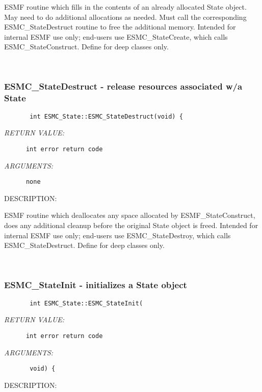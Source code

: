         ESMF routine which fills in the contents of an already
        allocated State object.  May need to do additional allocations
        as needed.  Must call the corresponding ESMC\_StateDestruct
        routine to free the additional memory.  Intended for internal
        ESMF use only; end-users use ESMC\_StateCreate, which calls
        ESMC\_StateConstruct.  Define for deep classes only.
   
 
\mbox{}\hrulefill\ 
 
\subsubsection{ESMC\_StateDestruct - release resources associated w/a State}


  
\begin{verbatim}       int ESMC_State::ESMC_StateDestruct(void) {\end{verbatim}{\em RETURN VALUE:}
\begin{verbatim}      int error return code\end{verbatim}{\em ARGUMENTS:}
\begin{verbatim}      none\end{verbatim}
{\sf DESCRIPTION:\\ }


        ESMF routine which deallocates any space allocated by
        ESMF\_StateConstruct, does any additional cleanup before the
        original State object is freed.  Intended for internal ESMF
        use only; end-users use ESMC\_StateDestroy, which calls
        ESMC\_StateDestruct.  Define for deep classes only.
   
 
\mbox{}\hrulefill\ 
 
\subsubsection{ESMC\_StateInit - initializes a State object}


  
\begin{verbatim}       int ESMC_State::ESMC_StateInit(\end{verbatim}{\em RETURN VALUE:}
\begin{verbatim}      int error return code\end{verbatim}{\em ARGUMENTS:}
\begin{verbatim}       void) {\end{verbatim}
{\sf DESCRIPTION:\\ }


